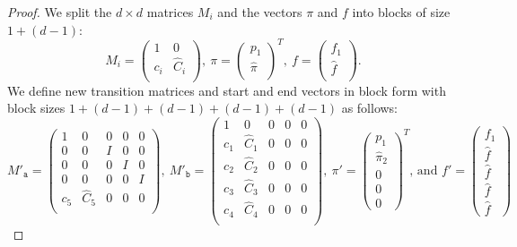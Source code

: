 \documentclass[a4paper,cleveref, autoref, thm-restate]{lipics-v2021}
\newcommand\eeta{f} %
\begin{document}
\begin{proof}
We split the $d\times d$ matrices $M_i$ and the vectors $\pi$ and $f$ into
blocks of size $1+(d-1)$:
\begin{displaymath}
  M_i =
  \begin{pmatrix}
    1&0\\
c_i&    \hat C_i \\
  \end{pmatrix}
,\ %
  \pi =
  \begin{pmatrix}
p_1\\    \hat \pi\\
\end{pmatrix}^{\!\!T}
,\
  \eeta =
  \begin{pmatrix}
    f_1\\
    \hat \eeta\\
  \end{pmatrix}
.
\end{displaymath}
We define new transition matrices and start and end vectors
in block form
with block sizes $1+(d-1)+(d-1)+(d-1)+(d-1)$
as follows:
\begin{displaymath}
  M'_{\mathtt{a}}=
  \begin{pmatrix}
  1&0&0&0&0\\
  0& 0 & I & 0&0 \\
  0& 0 & 0 & I&0  \\
 0& 0& 0 & 0 & I  \\
c_5 &  \hat C_5  &  0 &  0 & 0 \\
\end{pmatrix}
,\ %
M'_\mathtt{b}=
  \begin{pmatrix}
  1 & 0 & 0 & 0& 0\\
c_1&    \hat C_1 & 0 & 0& 0\\%
c_2&    \hat C_2 & 0 & 0& 0\\%
c_3&    \hat C_3 & 0 & 0& 0\\%
c_4&    \hat C_4 & 0 & 0& 0\\%
    \end{pmatrix}
,\ %
\pi' =
\begin{pmatrix}
  p_1\\
 \hat \pi_2\\0\\0\\0
\end{pmatrix} ^{\!\!T}
\!\!\text{, and }
f' =
\begin{pmatrix}
f_1\\\hat f\\\hat f\\\hat f\\\hat f

\end{pmatrix}
\end{displaymath}
\end{proof}
\end{document}
